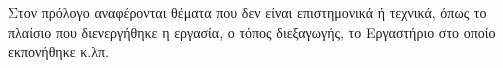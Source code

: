 \begin{preface}
Στον πρόλογο αναφέρονται θέματα που δεν είναι επιστημονικά ή τεχνικά, όπως το πλαίσιο που διενεργήθηκε η εργασία, ο τόπος διεξαγωγής, το Εργαστήριο στο οποίο εκπονήθηκε κ.λπ. 
\end{preface}